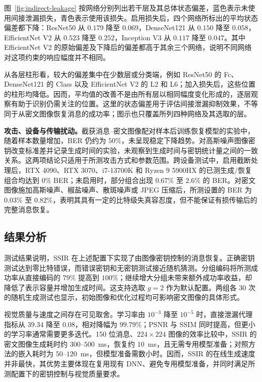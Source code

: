 图~\ref{fig:indirect-leakage} 按网络分别列出若干层及其总体状态偏差，蓝色表示未使用间接泄漏损失，青色表示使用该损失。启用损失后，四个网络所标出的平均状态偏差都下降：ResNet50 从 $0.179$ 降至 $0.069$，DenseNet121 从 $0.150$ 降至 $0.058$，EfficientNet V2 从 $0.523$ 降至 $0.252$，Inception V3 从 $0.117$ 降至 $0.047$。其中 EfficientNet V2 的原始偏差及下降后的偏差都高于其余三个网络，说明不同网络对这项约束的响应幅度并不相同。

从各层柱形看，较大的偏差集中在少数层或分类端，例如 ResNet50 的 Fc、DenseNet121 的 Class 以及 EfficientNet V2 的 L2 和 L6；加入损失后，这些位置的柱形均降低。因而，平均值的改善不是由所有层以相同幅度变化形成的，逐层观察有助于识别仍需关注的位置。这里的状态偏差用于评估间接泄漏抑制效果，不等同于从密文图像恢复消息的成功率；图示也只覆盖所列四种网络及其选取的层。

\textbf{攻击、设备与传输扰动。}截获消息--密文图像配对样本后训练恢复模型的实验中，随着样本数量增加，BER 仍约为 $50\%$，未呈现稳定下降趋势。对高斯噪声图像密钥改变标准差并记录生成时间的实验，未观察到生成时间与密钥统计量之间的一致关系。这两项结论只适用于所测攻击方式和参数范围。跨设备测试中，启用截断处理后，RTX 4090、RTX 3070、i7-13700K 和 Ryzen 9 5900HX 的已测生成/恢复组合均达到 $0\%$ BER；未启用时，部分组合出现 $0.67\%$ 至 $2.6\%$ 的 BER。对密文图像施加高斯噪声、椒盐噪声、散斑噪声或 JPEG 压缩后，所测设置的 BER 为 $0.03\%$ 至 $0.82\%$，表明其具有一定的比特级失真容忍度，但不能保证有损传输后的完整消息恢复。

\subsection{结果分析}

测试结果说明，SSIR 在上述配置下实现了由图像密钥控制的消息恢复。正确密钥测试达到零比特错误，而错误密钥和无密钥测试接近随机猜测。分组编码将所测成功率从直接编码的 $79\%$ 提高到 $100\%$；继续增大分组未带来额外成功率收益，却降低了表示容量并增加生成时间。这支持选取 $g=2$ 作为默认配置。两组各 30 次的随机生成测试也显示，初始图像和优化过程均可影响密文图像的具体形式。

视觉质量与速度之间存在可见取舍。学习率由 $10^{-3}$ 降至 $10^{-5}$ 时，直接泄漏代理指标从 $39.34$ 降至 $0.08$，相对降幅为 $99.79\%$；PSNR 与 SSIM 同时提高，但更小的学习率通常需要更多迭代。150 位消息、$224\times224$ 图像的效率比较中，SSIR 的密文图像生成耗时约 $300$--$500$~ms，恢复约 $10$~ms，且无需专用模型准备；对照方法的嵌入耗时为 $50$--$120$~ms，但模型准备需数小时。因而，SSIR 的在线生成速度并非最快，其优势主要体现在复用现有 DNN、避免专用模型准备，并同时满足所测配置下的密钥控制与视觉质量要求。

